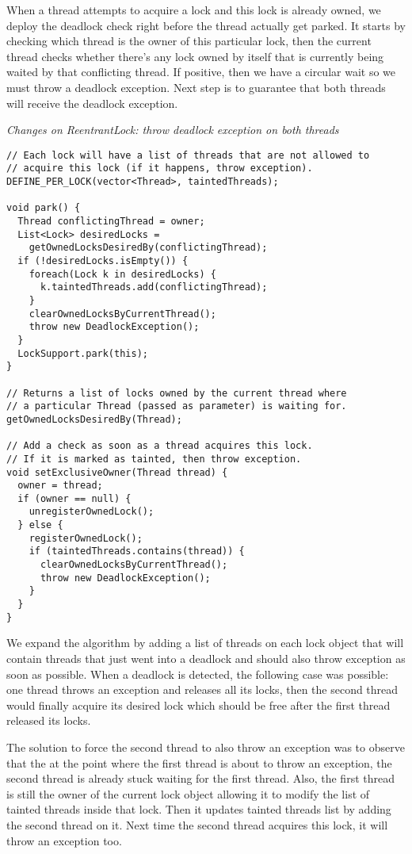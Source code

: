 When a thread attempts to acquire a lock and this lock is already owned, we deploy the deadlock check right before the thread actually get parked.
It starts by checking which thread is the owner of this particular lock, then the current thread checks whether there's any lock owned by itself
that is currently being waited by that conflicting thread. If positive, then we have a circular wait so we must throw a deadlock exception.
Next step is to guarantee that both threads will receive the deadlock exception.

\medskip
\noindent
{\it Changes on ReentrantLock: throw deadlock exception on both threads}
\begin{verbatim}
// Each lock will have a list of threads that are not allowed to
// acquire this lock (if it happens, throw exception).
DEFINE_PER_LOCK(vector<Thread>, taintedThreads);

void park() {
  Thread conflictingThread = owner;
  List<Lock> desiredLocks =
    getOwnedLocksDesiredBy(conflictingThread);
  if (!desiredLocks.isEmpty()) {
    foreach(Lock k in desiredLocks) {
      k.taintedThreads.add(conflictingThread);
    }
    clearOwnedLocksByCurrentThread();
    throw new DeadlockException();
  }
  LockSupport.park(this);
}

// Returns a list of locks owned by the current thread where
// a particular Thread (passed as parameter) is waiting for.
getOwnedLocksDesiredBy(Thread);

// Add a check as soon as a thread acquires this lock.
// If it is marked as tainted, then throw exception.
void setExclusiveOwner(Thread thread) {
  owner = thread;
  if (owner == null) {
    unregisterOwnedLock();
  } else {
    registerOwnedLock();
    if (taintedThreads.contains(thread)) {
      clearOwnedLocksByCurrentThread();
      throw new DeadlockException();
    }
  }
}

\end{verbatim}

We expand the algorithm by adding a list of threads on each lock object that will contain threads that just went into a deadlock and should also throw exception as soon as possible.
When a deadlock is detected, the following case was possible: one thread throws an exception and releases all its locks, then the second thread would finally acquire its desired lock
which should be free after the first thread released its locks.

The solution to force the second thread to also throw an exception was to observe that the at the point where the first thread is about to throw an exception, the second thread
is already stuck waiting for the first thread. Also, the first thread is still the owner of the current lock object allowing it to modify the list of tainted threads inside that lock.
Then it updates tainted threads list by adding the second thread on it. Next time the second thread acquires this lock, it will throw an exception too.

